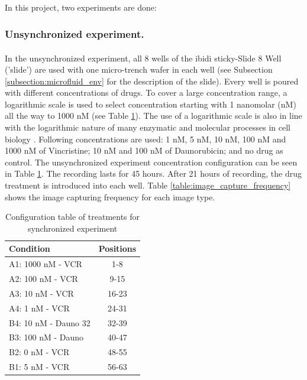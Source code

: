 \documentclass[pdftex,12pt,a4paper]{report}
\begin{document}
In this project, two experiments are done:

\subsubsection{Unsynchronized experiment.}

In the unsynchronized experiment, all 8 wells of the ibidi\textsuperscript{\textregistered} sticky-Slide 8 Well ('slide') are used with one micro-trench wafer in each well (see Subsection \ref{subsection:microfluid_env} for the description of the slide). Every well is poured with different concentrations of drugs. To cover a large concentration range, a logarithmic scale is used to select concentration starting with 1 nanomolar (nM) all the way to 1000 nM (see Table \ref{table:unsyn_treatments}). The use of a logarithmic scale is also in line with the logarithmic nature of many enzymatic and molecular processes in cell biology \cite{wilkinson1961statistical, savageau1969biochemical}. Following concentrations are used:  1 nM, 5 nM, 10 nM, 100 nM and 1000 nM of Vincristine; 10 nM and 100 nM of Daunorubicin; and no drug as control. The unsynchronized experiment concentration configuration can be seen in Table \ref{table:unsyn_treatments}. The recording lasts for 45 hours. After 21 hours of recording, the drug treatment is introduced into each well. Table \ref{table:image_capture_frequency} shows the image capturing frequency for each image type.

\begin{table}[H]
\centering
\begin{tabular}{| l | c |}
\hline
Condition & Positions \\
\hline
A1: 1000 nM - VCR & 1-8 \\
A2: 100 nM - VCR & 9-15 \\
A3: 10 nM - VCR & 16-23 \\
A4: 1 nM - VCR & 24-31 \\
B4: 10 nM - Dauno 32 & 32-39 \\
B3: 100 nM - Dauno & 40-47 \\
B2: 0 nM - VCR & 48-55 \\
B1: 5 nM - VCR & 56-63 \\
\hline
\end{tabular}
\caption{Configuration table of treatments for synchronized experiment}
\label{table:unsyn_treatments}
\end{table}
\end{document}
